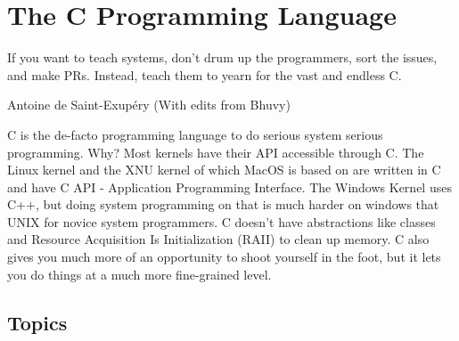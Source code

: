 \chapter{The C Programming Language}

\epigraph{If you want to teach systems, don't drum up the programmers, sort the issues, and make PRs. Instead, teach them to yearn for the vast and endless C.}{Antoine de Saint-Exup\'{e}ry (With edits from Bhuvy)}

\gls{C} is the de-facto programming language to do serious system serious programming.
Why?
Most kernels have their \gls{API} accessible through C.
The \gls{Linux kernel} \cite{Love} and the XNU kernel \citet{xnukernel} of which \gls{MacOS} is based on are written in C and have C API - Application Programming Interface.
The \gls{Windows Kernel} uses C++, but doing system programming on that is much harder on windows that \gls{UNIX} for novice system programmers.
C doesn't have \gls{abstractions} like classes and \gls{Resource Acquisition Is Initialization} (RAII) to clean up memory.
C also gives you much more of an opportunity to shoot yourself in the foot, but it lets you do things at a much more fine-grained level.











\section{Topics}

